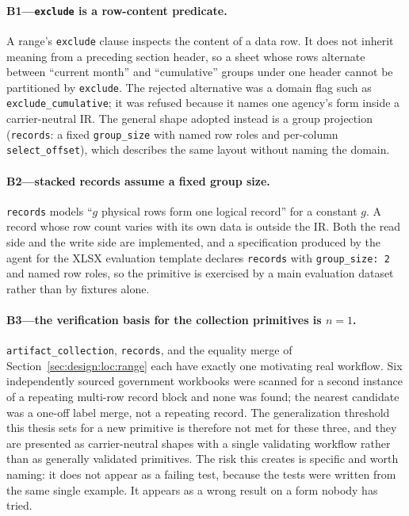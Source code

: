 \paragraph{B1---\texttt{exclude} is a row-content predicate.}
A range's \texttt{exclude} clause inspects the content of a data row. It does not inherit
meaning from a preceding section header, so a sheet whose rows alternate between
``current month'' and ``cumulative'' groups under one header cannot be partitioned by
\texttt{exclude}. The rejected alternative was a domain flag such as
\texttt{exclude\_cumulative}; it was refused because it names one agency's form inside a
carrier-neutral IR. The general shape adopted instead is a group projection
(\texttt{records}: a fixed \texttt{group\_size} with named row roles and per-column
\texttt{select\_offset}), which describes the same layout without naming the domain.

\paragraph{B2---stacked records assume a fixed group size.}
\texttt{records} models ``$g$ physical rows form one logical record'' for a constant $g$.
A record whose row count varies with its own data is outside the IR. Both the read side
and the write side are implemented, and a specification produced by the agent for the
XLSX evaluation template declares \texttt{records} with \texttt{group\_size: 2} and named
row roles, so the primitive is exercised by a main evaluation dataset rather than by
fixtures alone.

\paragraph{B3---the verification basis for the collection primitives is $n=1$.}
\texttt{artifact\_collection}, \texttt{records}, and the equality merge of
Section~\ref{sec:design:loc:range} each have exactly one motivating real workflow. Six
independently sourced government workbooks were scanned for a second instance of a
repeating multi-row record block and none was found; the nearest candidate was a one-off
label merge, not a repeating record. The generalization threshold this thesis sets for a
new primitive is therefore not met for these three, and they are presented as
carrier-neutral shapes with a single validating workflow rather than as generally
validated primitives. The risk this creates is specific and worth naming: it does not
appear as a failing test, because the tests were written from the same single example.
It appears as a wrong result on a form nobody has tried.


